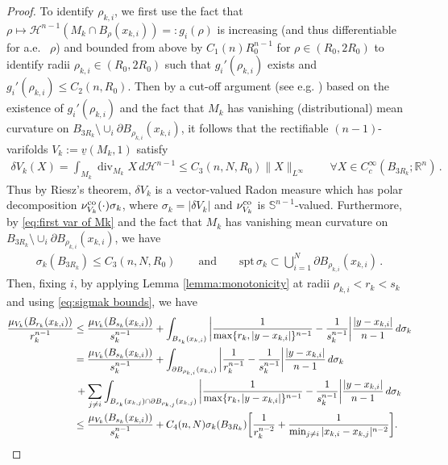 \documentclass[10pt,reqno]{amsart}
\numberwithin{equation}{section}
\theoremstyle{definition}
\newcommand{\Sbb}{\mathbb{S}}
\newcommand{\spt}{\mathrm{spt}}
\DeclareMathOperator{\Div}{div}
\begin{document}
{\begin{proof}
To identify $\rho_{k,i}$, we first use the fact that $\rho\mapsto \mathcal{H}^{n-1}(M_k \cap B_\rho(x_{k,i}))=:g_{i}(\rho)$ is increasing (and thus differentiable for a.e.~ $\rho$) and bounded from above by $C_1(n)R_0^{n-1}$ for $\rho \in (R_0,2R_0)$ to identify radii $\rho_{k,i}\in (R_0,2R_0)$ such that $g_{i}'(\rho_{k,i})$ exists and $g_{i}'(\rho_{k,i}) \leq C_2(n,R_0)$. Then by a cut-off argument (see e.g. \cite[Eq.~ 4.17]{BroNov24}) based on the existence of $g_{i}'(\rho_{k,i})$ and the fact that $M_k$ has vanishing (distributional) mean curvature on $B_{3R_k}\setminus \cup_{i} \partial B_{\rho_{k,i}}(x_{k,i})$, it follows that the rectifiable $(n-1)$-varifolds $V_k:=\underline{v}(M_k,1)$ satisfy 
\begin{align}\label{eq:first var of Mk}
    \delta V_k (X) = \int_{M_k} \Div_{M_k}X\,d\mathcal{H}^{n-1} \leq C_3(n,N,R_0)\|X\|_{L^\infty}\qquad \forall X\in C_c^\infty(B_{3R_k};\mathbb{R}^n)\,.
\end{align}
Thus by Riesz's theorem, $\delta V_k$ is a vector-valued Radon measure which has polar decomposition $\nu_{V_k}^{\rm co}(\cdot) \sigma_k$, where $\sigma_k = |\delta V_k|$ and $\nu_{V_k}^{\rm co}$ is $\Sbb^{n-1}$-valued. Furthermore, by \eqref{eq:first var of Mk} and the fact that $M_k$ has vanishing mean curvature on $B_{3R_k}\setminus \cup_{i}\partial B_{\rho_{k,i}}(x_{k,i})$, we have
\begin{align}\label{eq:sigmak bounds}
    \sigma_k(B_{3R_k})\leq C_3(n,N,R_0)\qquad \mbox{and}\qquad \spt\, \sigma_k \subset \bigcup_{i=1}^N\partial B_{\rho_{k,i}}(x_{k,i})\,.
\end{align}
Then, fixing $i$, by applying Lemma \ref{lemma:monotonicity} at radii $\rho_{k,i}<r_k<s_k$ and using \eqref{eq:sigmak bounds}, we have
\begin{align}\notag
    \frac{ \mu_{V_k}(B_{r_k}(x_{k,i}))}{r_k^{n-1}} &\leq \frac{\mu_{V_k}(B_{s_k}(x_{k,i}))}{s_k^{n-1}} +  \int_{B_{s_k}(x_{k,i})}\bigg|\frac{1}{\max\{r_k,|y-x_{k,i}|\}^{n-1}}-\frac{1}{s_k^{n-1}}\bigg|\frac{|y-x_{k,i}|}{n-1}\,d\sigma_k \\ \notag
    &= \frac{\mu_{V_k}(B_{s_k}(x_{k,i}))}{s_k^{n-1}} + \int_{\partial B_{\rho_{k,i}}(x_{k,i})}\bigg|\frac{1}{r_k^{n-1}}-\frac{1}{s_k^{n-1}}\bigg|\frac{|y-x_{k,i}|}{n-1}\,d\sigma_k \\ \notag
    &\,+ \sum_{j\neq i}\int_{B_{s_k}(x_{k,j}) \cap \partial B_{\rho_{k,j}}(x_{k,j})}\bigg|\frac{1}{\max\{r_k,|y-x_{k,i}|\}^{n-1}}-\frac{1}{s_k^{n-1}}\bigg|\frac{|y-x_{k,i}|}{n-1}\,d\sigma_k \\ \notag
    &\leq  \frac{\mu_{V_k}(B_{s_k}(x_{k,i}))}{s_k^{n-1}} + C_4(n,N)\sigma_k(B_{3R_k})\bigg[\frac{1}{r_k^{n-2}} + \frac{1}{\min_{j\neq i}|x_{k,i}-x_{k,j}|^{n-2}}\bigg].
\end{align}


\end{proof}}
\end{document}
